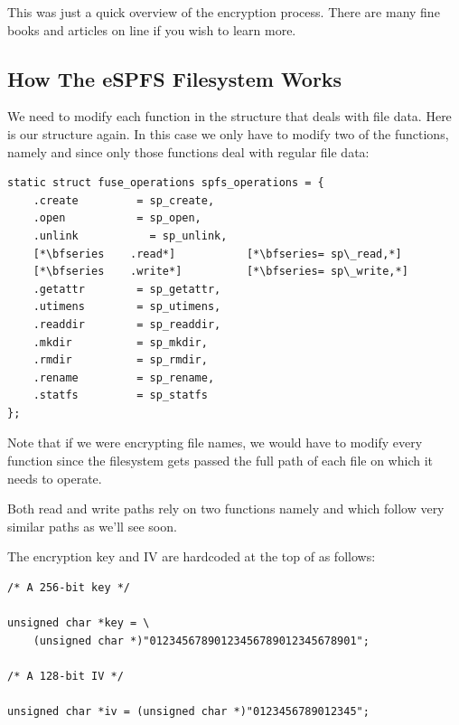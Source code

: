 \noindent
This was just a quick overview of the encryption process. There are many fine books and articles on line if you wish to learn more.


\subsection{How The eSPFS Filesystem Works}


We need to modify each function in the  structure that deals with file data. Here is our structure again. In this case we only have to modify two of the functions, namely  and  since only those functions deal with regular file data:

\begin{lstlisting}
static struct fuse_operations spfs_operations = {
    .create         = sp_create, 
    .open           = sp_open,
    .unlink           = sp_unlink,
    [*\bfseries    .read*]           [*\bfseries= sp\_read,*]
    [*\bfseries    .write*]          [*\bfseries= sp\_write,*]
    .getattr        = sp_getattr,
    .utimens        = sp_utimens,
    .readdir        = sp_readdir,
    .mkdir          = sp_mkdir,
    .rmdir          = sp_rmdir,
    .rename         = sp_rename,
    .statfs         = sp_statfs
};
\end{lstlisting}

\noindent
Note that if we were encrypting file names, we would have to modify every function since the filesystem gets passed the full path of each file on which it needs to operate.

Both read and write paths rely on two functions namely  and  which follow very similar paths as we'll see soon.

The encryption key and IV are hardcoded at the top of  as follows:

\begin{lstlisting}
/* A 256-bit key */

unsigned char *key = \
    (unsigned char *)"01234567890123456789012345678901";

/* A 128-bit IV */

unsigned char *iv = (unsigned char *)"0123456789012345";
\end{lstlisting}

